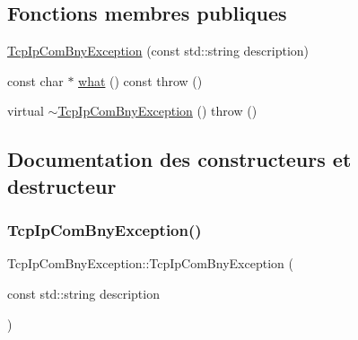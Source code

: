 \subsection*{Fonctions membres publiques}
\begin{DoxyCompactItemize}
\item 
\hyperlink{classTcpIpComBnyException_a6ef8fb4ec6b283a18b9f4c98c2ac92d8}{Tcp\+Ip\+Com\+Bny\+Exception} (const std\+::string description)
\item 
const char $\ast$ \hyperlink{classTcpIpComBnyException_a5a5d21a18a7863b106020a2c6113402d}{what} () const  throw ()
\item 
virtual \hyperlink{classTcpIpComBnyException_a587dd6d16b9c48e652e7b3c59f2acd81}{$\sim$\+Tcp\+Ip\+Com\+Bny\+Exception} ()  throw ()
\end{DoxyCompactItemize}


\subsection{Documentation des constructeurs et destructeur}
\mbox{\label{classTcpIpComBnyException_a6ef8fb4ec6b283a18b9f4c98c2ac92d8}} 
\subsubsection{\texorpdfstring{Tcp\+Ip\+Com\+Bny\+Exception()}{TcpIpComBnyException()}}
{\footnotesize\ttfamily Tcp\+Ip\+Com\+Bny\+Exception\+::\+Tcp\+Ip\+Com\+Bny\+Exception (\begin{DoxyParamCaption}\item[{const std\+::string}]{description }\end{DoxyParamCaption})\hspace{0.3cm}{\ttfamily [inline]}}

\mbox{\label{classTcpIpComBnyException_a587dd6d16b9c48e652e7b3c59f2acd81}} 
